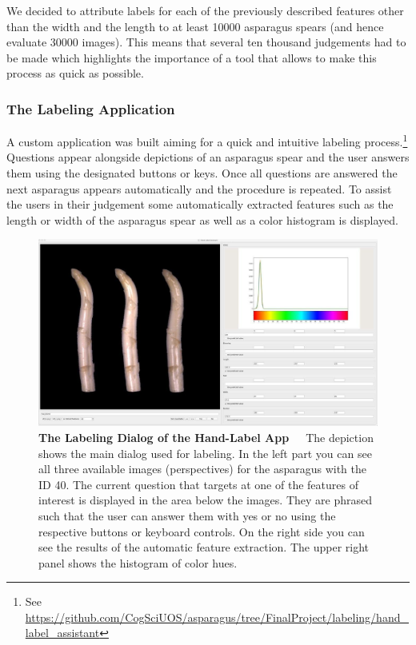 We decided to attribute labels for each of the previously described features other than the width and the length to at least 10000 asparagus spears (and hence evaluate 30000 images). This means that several ten thousand judgements had to be made which highlights the importance of a tool that allows to make this process as quick as possible.


\subsubsection{The Labeling Application}
\label{subsec:LabelApp}

A custom application was built aiming for a quick and intuitive labeling process.\footnote{ See \url{https://github.com/CogSciUOS/asparagus/tree/FinalProject/labeling/hand\_label\_assistant}} Questions appear alongside depictions of an asparagus spear and the user answers them using the designated buttons or keys. Once all questions are answered the next asparagus appears automatically and the procedure is repeated. To assist the users in their judgement some automatically extracted features such as the length or width of the asparagus spear as well as a color histogram is displayed.

\begin{figure}[!htb]
	\centering
	\includegraphics[scale=0.3]{Figures/chapter03/labelapp_example.png}
	\decoRule
	\caption[The Labeling Dialog of the Hand-Label App]{\textbf{The Labeling Dialog of the Hand-Label App}~~~The depiction shows the main dialog used for labeling. In the left part you can see all three available images (perspectives) for the asparagus with the ID 40. The current question that targets at one of the features of interest is displayed in the area below the images. They are phrased such that the user can answer them with yes or no using the respective buttons or keyboard controls. On the right side you can see the results of the automatic feature extraction. The upper right panel shows the histogram of color hues.}
	\label{fig:LabelAppGUI}
\end{figure}

